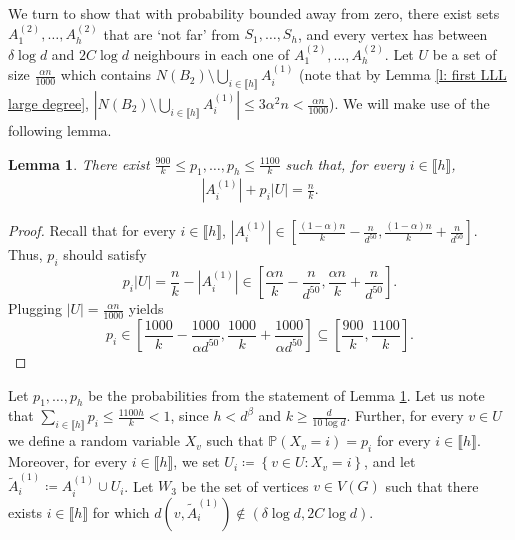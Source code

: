 \documentclass[notitlepage]{scrartcl}
\newcommand{\br}[1]{\llbracket{#1}\rrbracket}
\newtheorem{lemma}[thm]{Lemma}
\begin{document}
We turn to show that with probability bounded away from zero, there exist sets $A_1^{(2)},\ldots,A_h^{(2)}$ that are `not far' from $S_1,\ldots, S_h$, and every vertex has between $\delta\log d$ and $2C\log d$ neighbours in each one of $A_1^{(2)},\ldots, A_h^{(2)}$. Let $U$ be a set of size $\frac{\alpha n}{1000}$ which contains $N(B_2)\setminus \bigcup_{i\in \br{h}}A_i^{(1)}$ (note that by Lemma \ref{l: first LLL large degree}, $\left|N(B_2)\setminus \bigcup_{i\in \br{h}}A_i^{(1)}\right|\le 3\alpha^2n<\frac{\alpha n}{1000}$). We will make use of the following lemma.
\begin{lemma}\label{l: sprinkling probability}
There exist $\frac{900}{k}\le p_1,\ldots, p_h\le \frac{1100}{k}$ such that, for every $i\in \br{h}$, 
\begin{align*}
    |A_i^{(1)}|+p_i|U|=\frac{n}{k}.
\end{align*}
\end{lemma}
\begin{proof}
Recall that for every $i\in \br{h}$, $|A_i^{(1)}|\in \left[\frac{(1-\alpha)n}{k}-\frac{n}{d^{50}},\frac{(1-\alpha)n}{k}+\frac{n}{d^{50}}\right]$. Thus, $p_i$ should satisfy
\[
    p_i |U| = \frac{n}{k} - |A_i^{(1)}| \in \left[\frac{\alpha n}{k} - \frac{n}{d^{50}}, \frac{\alpha n}{k} + \frac{n}{d^{50}}\right].
\]
Plugging $|U| = \frac{\alpha n}{1000}$ yields
\[
    p_i \in \left[\frac{1000}{k} - \frac{1000}{\alpha d^{50}}, \frac{1000}{k} + \frac{1000}{\alpha d^{50}}\right] \subseteq \left[\frac{900}{k}, \frac{1100}{k}\right].
\]
\end{proof}

Let $p_1,\ldots, p_h$ be the probabilities from the statement of Lemma \ref{l: sprinkling probability}. Let us note that $\sum_{i\in \br{h}}p_i\le \frac{1100h}{k}<1$, since $h< d^\beta$ and $k\ge \frac{d}{10\log d}$. Further, for every $v\in U$ we define a random variable $X_v$ such that $\mathbb{P}\left(X_v=i\right)=p_i$ for every $i\in \br{h}$. Moreover, for every $i\in \br{h}$, we set $U_i\coloneqq\left\{v\in U\colon X_v=i\right\}$, and let $\tilde{A}_i^{(1)}\coloneqq A_i^{(1)}\cup U_i$. Let $W_3$ be the set of vertices $v\in V(G)$ such that there exists $i\in \br{h}$ for which $d(v,\tilde{A}_i^{(1)})\notin (\delta\log d, 2C\log d)$. 
\end{document}
